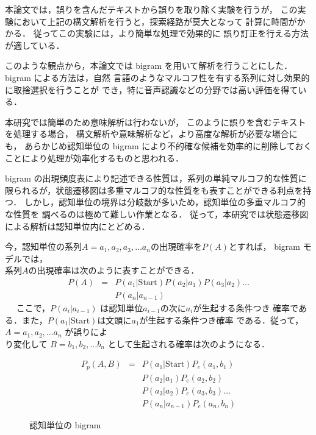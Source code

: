 本論文では，誤りを含んだテキストから誤りを取り除く実験を行うが，
この実験において上記の構文解析を行うと，探索経路が莫大となって
計算に時間がかかる．
従ってこの実験には，より簡単な処理で効果的に
誤り訂正を行える方法が適している．

このような観点から，本論文では
bigram を用いて解析を行うことにした．bigram による方法は，自然
言語のようなマルコフ性を有する系列に対し効果的に取捨選択を行うことが
でき，特に音声認識などの分野では高い評価を得ている．

本研究では簡単のため意味解析は行わないが，
このように誤りを含むテキストを処理する場合，
構文解析や意味解析など，より高度な解析が必要な場合にも，
あらかじめ認知単位の bigram により不的確な候補を効率的に削除しておく
ことにより処理が効率化するものと思われる．

bigram の出現頻度表により記述できる性質は，系列の単純マルコフ的な性質に
限られるが，状態遷移図は多重マルコフ的な性質をも表すことができる利点を持つ．
しかし，認知単位の境界は分岐数が多いため，認知単位の多重マルコフ的な性質を
調べるのは極めて難しい作業となる．
従って，本研究では状態遷移図による解析は認知単位内にとどめる．

今，認知単位の系列$A={a_1, a_2, a_3,\ldots a_n}$の出現確率を$P(A)$とすれば，
\hspace*{-1mm}bigram モデルでは，\\系列$A$の出現確率は次のように表すことができる．
\vspace*{-1mm}
\begin{eqnarray}
P(A)& = & P(a_1|\mbox{Start}) P(a_2|a_1) P(a_3|a_2) \ldots \nonumber \\
& & P(a_n|a_{n-1})
\end{eqnarray}
　 ここで，\hspace*{1mm}$P(a_i|a_{i-1})$ \hspace*{1mm}は認知単位\hspace*{1mm}$a_{i-1}$\hspace*{1mm}の次に\hspace*{1mm}$a_i$\hspace*{1mm}が生起する条件つき
確率である．\hspace*{1mm}また，$P(a_1|\mbox{Start})$は文頭に$a_1$が生起する条件つき確率
である．従って，$A={a_1, a_2, \ldots a_n}$ が誤りによ\\り変化して
$B={b_1, b_2, \ldots b_n}$ として生起される確率は次のようになる．

\begin{eqnarray}
P_p(A, B) & = & P(a_1|\mbox{Start}) P_e(a_1, b_1) \nonumber \\
& & P(a_2|a_1) P_e(a_2,b_2) \nonumber \\
& & P(a_3|a_2) P_e(a_3,b_3) \ldots  \nonumber \\
& & P(a_n|a_{n-1}) P_e(a_n,b_n)  \label{eqa1}
\end{eqnarray}
\begin{figure}
\begin{center}
\end{center}
\caption{認知単位の bigram} \label{zu7}
\vspace*{3mm}
\end{figure}

